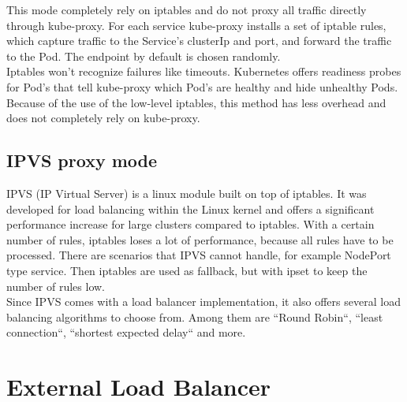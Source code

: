 This mode completely rely on iptables and do not proxy all traffic directly through kube-proxy.
For each service kube-proxy installs a set of iptable rules, which capture traffic to the Service's clusterIp and port, and forward the traffic to the Pod.
The endpoint by default is chosen randomly.
\\
Iptables won't recognize failures like timeouts.
Kubernetes offers readiness probes for Pod's that tell kube-proxy which Pod's are healthy and hide unhealthy Pods.
\\
Because of the use of the low-level iptables, this method has less overhead and does not completely rely on kube-proxy.

\subsection{IPVS proxy mode}

IPVS (IP Virtual Server) is a linux module built on top of iptables.
It was developed for load balancing within the Linux kernel and offers a significant performance increase for large clusters compared to iptables.
With a certain number of rules, iptables loses a lot of performance, because all rules have to be processed.
There are scenarios that IPVS cannot handle, for example NodePort type service.
Then iptables are used as fallback, but with ipset to keep the number of rules low.
\\
Since IPVS comes with a load balancer implementation, it also offers several load balancing algorithms to choose from.
Among them are ``Round Robin``, ``least connection``, ``shortest expected delay`` and more.

\section{External Load Balancer}\label{sec:ExternalLoadBalancer}

